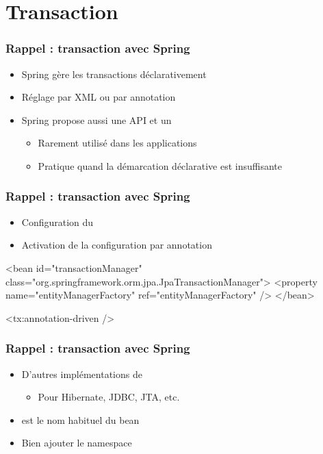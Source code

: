 \section{Transaction}



\begin{frame}
 \frametitle{Rappel : transaction avec Spring}
 \begin{itemize}
  \item Spring gère les transactions déclarativement
  \item Réglage par XML ou par annotation
  \item Spring propose aussi une API et un 
  \begin{itemize}
   \item Rarement utilisé dans les applications
   \item Pratique quand la démarcation déclarative est insuffisante
  \end{itemize}
 \end{itemize}
\end{frame}


\begin{frame}[fragile]
 \frametitle{Rappel : transaction avec Spring}

 \begin{itemize}
  \item Configuration du 
  \item Activation de la configuration par annotation
 \end{itemize}

 \begin{xmlcode}
<bean id="transactionManager" 
      class="org.springframework.orm.jpa.JpaTransactionManager">
  <property name="entityManagerFactory" ref="entityManagerFactory" />
</bean>

<tx:annotation-driven />
 \end{xmlcode}
\end{frame}

\begin{frame}
 \frametitle{Rappel : transaction avec Spring}

 \begin{itemize}
  \item D'autres implémentations de 
  \begin{itemize}
   \item Pour Hibernate, JDBC, JTA, etc.
  \end{itemize}
  \item {} est le nom habituel du bean
  \item Bien ajouter le namespace 
 \end{itemize}
 
\end{frame}

